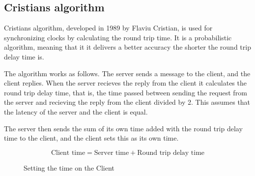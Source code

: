 \subsection{Cristians algorithm}
\label{sec:christian}
Cristians algorithm\cite{cristian}, developed in 1989 by Flaviu Cristian, is used for synchronizing clocks by calculating the round trip time. It is a probabilistic algorithm\cite{cristian}, meaning that it it delivers a better accuracy the shorter the round trip delay time is. 

The algorithm works as follows. The server sends a message to the client, and the client replies. When the server recieves the reply from the client it calculates the round trip delay time, that is, the time passed between sending the request from the server and recieving the reply from the client divided by 2. This assumes that the latency of the server and the client is equal.

The server then sends the sum of its own time added with the round trip delay time to the client, and the client sets this as its own time. 

\begin{figure}[h!]
	\begin{displaymath}
		\text{Client time} = \text{Server time} + \text{Round trip delay time}
	\end{displaymath}
	\caption{Setting the time on the Client}
	\label{fig:crist}
\end{figure}

